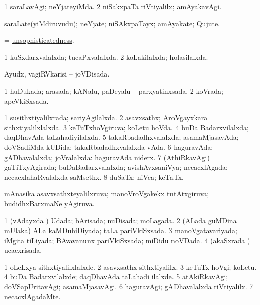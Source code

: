 \bentry
{} 
\gl{\kirxvi}
\expl{}
\bmng
\bnum
\num{1} saraLavAgi; neYjateyiMda. 
\num{2} niSakxpaTa riVtiyalilx; amAyakavAgi. 
\enum
\emng
\eentry

\bentry
{} 
\gl{\nA}
\expl{}
\bmng
saraLate(yiMdiruvudu); neYjate; niSAkxpaTayx; amAyakate; Qujute. 
\emng
\eentry

\bentry
{} 
\gl{\nA}
\expl{}
\bmng
= \hyperlink{unsophisticatedness}{unsophisticatedness}. 
\emng
\eentry

\bentry
{} 
\gl{\gu}
\expl{}
\bmng
\bnum
\num{1} kuSxdarxvalalxda; tucaPxvalalxda. 
\num{2} koLakilalxda; holasilalxda. 
\enum
\emng
\eentry

\bentry
{} 
\gl{\gu}
\expl{}
\bmng
Ayudx, vagiRVkarisi -- joVDisada. 
\emng
\eentry

\bentry
{} 
\gl{\gu}
\expl{}
\bmng
\bnum
\num{1} huDukada; arasada; kANalu, paDeyalu -- parxyatinxsada. 
\num{2} koVrada; apeVkiSxsada. 
\enum
\emng
\eentry

\bentry
{} 
\gl{\gu}
\expl{}
\bmng
\bnum
\num{1} susithxtiyalilxrada; sariyAgilalxda. 
\num{2} asavxsathx; AroVgayxkara sithxtiyalilxlalxda. 
\num{3} keTuTxhoVgiruva; koLetu hoVda. 
\num{4} buDa Badarxvilalxda; daqDhavAda taLahadiyilalxda. 
\num{5} takaRbadadhxvalalxda; asamaMjasavAda; doVSadiMda kUDida:  takaRbadadhxvalalxda vAda. 
\num{6} haguravAda; gADhavalalxda; joVralalxda:  haguravAda niderx. 
\num{7} (AthiRkavAgi) gaTiTxyAgirada; buDaBadarxvalalxda; avishAvxsaniVya; necacxlAgada:  necacxlahaRvalalxda saMsethx. 
\num{8} duSaTx; niVca; keTaTx. 
\enum
\emng

\noindent
\gl{\pagu}
\expl{}
\bmng
{} mAnasika asavxsathxteyalilxruva; manoVroVgakekx tutAtxgiruva; budidhxBarxmaNe yAgiruva. 
\emng
\eentry

\bentry
{} 
\gl{\gu}
\expl{}
\bmng
\bnum
\num{1} (vAdayxda \vi) Udada; bArisada; nuDisada; moLagada. 
\num{2} (ALada guMDina mUlaka) ALa kaMDuhiDiyada; taLa pariVkiSxsada. 
\num{3} manoVgatavariyada; iMgita tiLiyada; BAvavanunx pariVkiSxsada; miDidu noVDada. 
\num{4} (akaSxrada \vi) ucacxrisada. 
\enum
\emng
\eentry

\bentry
{} 
\gl{\kirxvi}
\expl{}
\bmng
\bnum
\num{1} oLeLxya sithxtiyalilxlalxde. 
\num{2} asavxsathx sithxtiyalilx. 
\num{3} keTuTx hoVgi; koLetu. 
\num{4} buDa Badarxvilalxde; daqDhavAda taLahadi ilalxde. 
\num{5} atAkiRkavAgi; doVSapUritavAgi; asamaMjasavAgi. 
\num{6} haguravAgi; gADhavalalxda riVtiyalilx. 
\num{7} necacxlAgadaMte. 
\enum
\emng
\eentry

